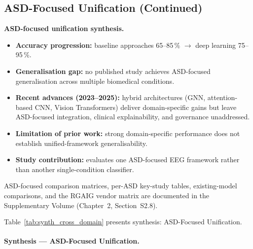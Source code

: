 \subsection{ASD-Focused Unification (Continued)}

\noindent\textbf{ASD-focused unification synthesis.}
\begin{itemize}[leftmargin=*, itemsep=2pt]
    \item \textbf{Accuracy progression:} baseline approaches 65--85\,\% $\to$ deep learning 75--95\,\%.
    \item \textbf{Generalisation gap:} no published study achieves ASD-focused generalisation across multiple biomedical conditions.
    \item \textbf{Recent advances (2023--2025):} hybrid architectures (GNN, attention-based CNN, Vision Transformers) deliver domain-specific gains but leave ASD-focused integration, clinical explainability, and governance unaddressed.
    \item \textbf{Limitation of prior work:} strong domain-specific performance does not establish unified-framework generalisability.
    \item \textbf{Study contribution:} evaluates one ASD-focused EEG framework rather than another single-condition classifier.
\end{itemize}
\noindent ASD-focused comparison matrices, per-ASD key-study tables, existing-model comparisons, and the RGAIG vendor matrix are documented in the Supplementary Volume (Chapter~2, Section~S2.8).



\noindent Table~\ref{tab:synth_cross_domain} presents synthesis: ASD-Focused Unification.

\paragraph{Synthesis --- ASD-Focused Unification.}



